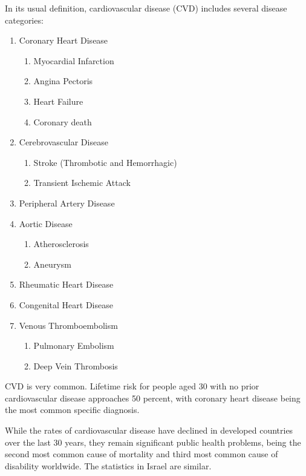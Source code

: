 \documentclass[a4paper,12pt]{article}
\begin{document}
		In its usual definition, cardiovascular disease (CVD) includes several disease categories\cite{WHO2017}:
		\begin{enumerate}
			\item Coronary Heart Disease
			\begin{enumerate}
				\item Myocardial Infarction
				\item Angina Pectoris
				\item Heart Failure
				\item Coronary death
			\end{enumerate}
			\item Cerebrovascular Disease
			\begin{enumerate}
				\item Stroke (Thrombotic and Hemorrhagic)
				\item Transient Ischemic Attack
			\end{enumerate}
			\item Peripheral Artery Disease
			\item Aortic Disease
			\begin{enumerate}
				\item Atherosclerosis
				\item Aneurysm
			\end{enumerate}
			\item Rheumatic Heart Disease
			\item Congenital Heart Disease
			\item Venous Thromboembolism
			\begin{enumerate}
				\item Pulmonary Embolism
				\item Deep Vein Thrombosis
			\end{enumerate}
		\end{enumerate}
		
		CVD is very common. Lifetime risk for people aged 30 with no prior cardiovascular disease approaches 50 percent\cite{Rapsomaniki2014}, with coronary heart disease being the most common specific diagnosis\cite{Benjamin2017}.
		
		While the rates of cardiovascular disease have declined in developed countries over the last 30 years\cite{Koton2014,Vangen-Loenne2017}, they remain significant public health problems, being the second most common cause of mortality and third most common cause of disability worldwide\cite{Lozano2012}. The statistics in Israel are similar\cite{ICDC2017}.
		
\end{document}
